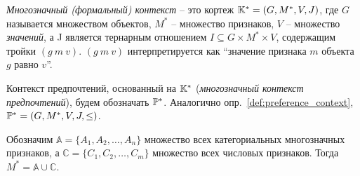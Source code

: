 	\begin{definition}
		\label{def:multivalued_context}
		\emph{Многозначный (формальный) контекст} – это кортеж $\mathbb{K}^* = (G, M^*, V, J)$, где $G$ называется множеством объектов, $M^*$ – множество признаков, $V$ – множество \emph{значений}, а J является тернарным отношением ${I \subseteq G \times M^* \times V}$, содержащим тройки $(g\:m\:v)$. $(g\:m\:v)$ интерпретируется как ``значение признака $m$ объекта $g$ равно $v$''. 
	\end{definition}
	
	Контекст предпочтений, основанный на $\mathbb{K}^*$ (\emph{многозначный контекст предпочтений}), будем обозначать $\mathbb{P}^*$. Аналогично опр.~\ref{def:preference_context}, $\mathbb{P}^* = (G, M^*, V, J, \leq)$.
	
	Обозначим $\mathbb{A} = \{A_1, A_2, \dots, A_n\}$ множество всех категориальных многозначных признаков, а $\mathbb{C} = \{C_1, C_2, \dots, C_m\}$ множество всех числовых признаков. Тогда $M^* = \mathbb{A} \cup \mathbb{C}$.
	

